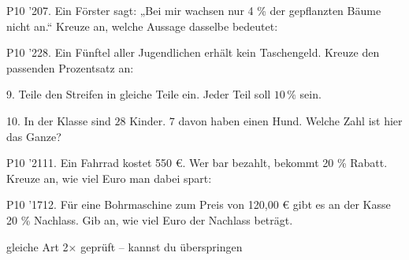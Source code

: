 \documentclass[11pt]{article}
\begin{document}
\pfgruppe{}
\begin{pfaufg}{P10 ’20}{7.}{}
Ein Förster sagt: „Bei mir wachsen nur 4 \% der gepflanzten Bäume nicht an.“ Kreuze an, welche Aussage dasselbe bedeutet:
\end{pfaufg}
\pfgruppe{}
\begin{pfaufg}{P10 ’22}{8.}{}
Ein Fünftel aller Jugendlichen erhält kein Taschengeld. Kreuze den passenden Prozentsatz an:
\end{pfaufg}
\pfgruppe{}
\begin{pfaufg}{}{9.}{}
Teile den Streifen in gleiche Teile ein. Jeder Teil soll $10\,\%$ sein.
\par\smallskip\noindent \streifenleer[0]\par
{}
\end{pfaufg}
\begin{pfaufg}{}{10.}{}
In der Klasse sind $28$ Kinder. $7$ davon haben einen Hund. Welche Zahl ist hier das Ganze?
\end{pfaufg}
\pfgruppe{}
\begin{pfaufg}{P10 ’21}{11.}{}
Ein Fahrrad kostet 550 €. Wer bar bezahlt, bekommt 20 \% Rabatt. Kreuze an, wie viel Euro man dabei spart:
\end{pfaufg}
\pfgruppe{}
\begin{pfaufg}{P10 ’17}{12.}{}
Für eine Bohrmaschine zum Preis von 120,00 € gibt es an der Kasse 20 \% Nachlass. Gib an, wie viel Euro der Nachlass beträgt.
\end{pfaufg}
\begin{pfbuendel}{gleiche Art \textperiodcentered{} 2$\times$ geprüft – kannst du überspringen}
\end{pfbuendel}
\end{document}
